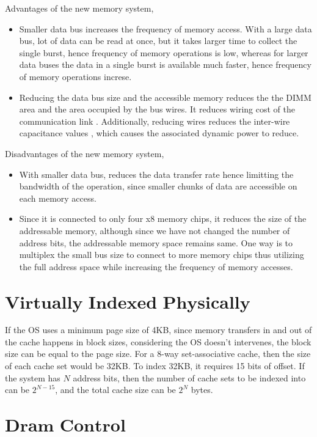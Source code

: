 \documentclass{tufte-handout}
\begin{document}
	Advantages of the new memory system,
	\begin{itemize}
		\item Smaller data bus increases the frequency of memory access. With a large data bus, lot of data can be read at once, but it takes larger time to collect the single burst, hence frequency of memory operations is low, whereas for larger data buses the data in a single burst is available much faster, hence frequency of memory operations increse.
		\item Reducing the data bus size and the accessible memory reduces the the DIMM area and the area occupied by the bus wires. It reduces wiring cost of the communication link . Additionally, reducing wires reduces the inter-wire capacitance values , which causes the associated dynamic power to reduce.
	\end{itemize}

	Disadvantages of the new memory system,
	\begin{itemize}
		\item With smaller data bus, reduces the data transfer rate hence limitting the bandwidth of the operation, since smaller chunks of data are accessible on each memory access.
		\item  Since it is connected to only four x8 memory chips, it reduces the size of the addressable memory, although since we have not changed the number of address bits, the addressable memory space remains same. One way is to multiplex the small bus size to connect to more memory chips thus utilizing the full address space while increasing the frequency of memory accesses.
	\end{itemize}


\section{$\textbf{Virtually Indexed Physically Tagged}$}
	If the OS uses a minimum page size of 4KB, since memory transfers in and out of the cache happens in block sizes, considering the OS doesn't intervenes, the block size can be equal to the page size. For a 8-way set-associative cache, then the size of each cache set would be 32KB. To index 32KB, it requires 15 bits of offset. If the system has $N$ address bits, then the number of cache sets to be indexed into can be $2^{N-15}$, and the total cache size can be $2^N$ bytes.

\section{$\textbf{Dram Control}$}
\end{document}
